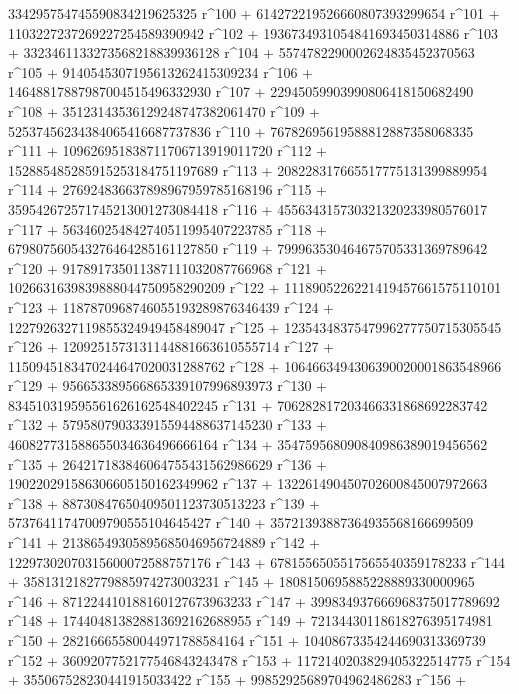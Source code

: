        334295754745590834219625325 r^100 + 
       614272219526660807393299654 r^101 + 
       1103227237269227254589390942 r^102 + 
       1936734931054841693450314886 r^103 + 
       3323461133273568218839936128 r^104 + 
       5574782290002624835452370563 r^105 + 
       9140545307195613262415309234 r^106 + 
       14648817887987004515496332930 r^107 + 
       22945059903990806418150682490 r^108 + 
       35123143536129248747382061470 r^109 + 
       52537456234384065416687737836 r^110 + 
       76782695619588812887358068335 r^111 + 
       109626951838711706713919011720 r^112 + 
       152885485285915253184751197689 r^113 + 
       208228317665517775131399889954 r^114 + 
       276924836637898967959785168196 r^115 + 
       359542672571745213001273084418 r^116 + 
       455634315730321320233980576017 r^117 + 
       563460254842740511995407223785 r^118 + 
       679807560543276464285161127850 r^119 + 
       799963530464675705331369789642 r^120 + 
       917891735011387111032087766968 r^121 + 
       1026631639839888044750958290209 r^122 + 
       1118905226221419457661575110101 r^123 + 
       1187870968746055193289876346439 r^124 + 
       1227926327119855324949458489047 r^125 + 
       1235434837547996277750715305545 r^126 + 
       1209251573131144881663610555714 r^127 + 
       1150945183470244647020031288762 r^128 + 
       1064663494306390020001863548966 r^129 + 
       956653389566865339107996893973 r^130 + 
       834510319595561626162548402245 r^131 + 
       706282817203466331868692283742 r^132 + 
       579580790333915594488637145230 r^133 + 
       460827731588655034636496666164 r^134 + 
       354759568090840986389019456562 r^135 + 
       264217183846064755431562986629 r^136 + 
       190220291586306605150162349962 r^137 + 
       132261490450702600845007972663 r^138 + 
       88730847650409501123730513223 r^139 + 
       57376411747009790555104645427 r^140 + 
       35721393887364935568166699509 r^141 + 
       21386549305895685046956724889 r^142 + 
       12297302070315600072588757176 r^143 + 
       6781556505517565540359178233 r^144 + 
       3581312182779885974273003231 r^145 + 
       1808150695885228889330000965 r^146 + 
       871224410188160127673963233 r^147 + 
       399834937666968375017789692 r^148 + 
       174404813828813692162688955 r^149 + 
       72134430118618276395174981 r^150 + 
       28216665580044971788584164 r^151 + 
       10408673354244690313369739 r^152 + 
       3609207752177546843243478 r^153 + 
       1172140203829405322514775 r^154 + 
       355067528230441915033422 r^155 + 
       99852925689704962486283 r^156 + 
